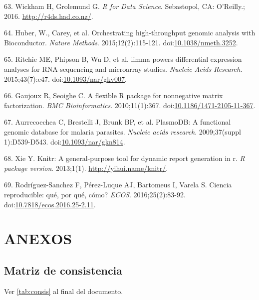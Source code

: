 \documentclass[a4paper]{article}
\begin{document}
\hypertarget{ref-wickham2016r4ds}{}
63. Wickham H, Grolemund G. \emph{R for Data Science}. Sebastopol, CA:
O'Reilly.; 2016. \url{http://r4ds.had.co.nz/}.

\hypertarget{ref-Biobase}{}
64. Huber, W., Carey, et al. Orchestrating high-throughput genomic
analysis with Bioconductor. \emph{Nature Methods}. 2015;12(2):115-121.
doi:\href{https://doi.org/10.1038/nmeth.3252}{10.1038/nmeth.3252}.

\hypertarget{ref-limma}{}
65. Ritchie ME, Phipson B, Wu D, et al. limma powers differential
expression analyses for RNA-sequencing and microarray studies.
\emph{Nucleic Acids Research}. 2015;43(7):e47.
doi:\href{https://doi.org/10.1093/nar/gkv007}{10.1093/nar/gkv007}.

\hypertarget{ref-Gaujoux2010NMF}{}
66. Gaujoux R, Seoighe C. A flexible R package for nonnegative matrix
factorization. \emph{BMC Bioinformatics}. 2010;11(1):367.
doi:\href{https://doi.org/10.1186/1471-2105-11-367}{10.1186/1471-2105-11-367}.

\hypertarget{ref-plasmodb}{}
67. Aurrecoechea C, Brestelli J, Brunk BP, et al. PlasmoDB: A functional
genomic database for malaria parasites. \emph{Nucleic acids research}.
2009;37(suppl 1):D539-D543.
doi:\href{https://doi.org/10.1093/nar/gkn814}{10.1093/nar/gkn814}.

\hypertarget{ref-knitr}{}
68. Xie Y. Knitr: A general-purpose tool for dynamic report generation
in r. \emph{R package version}. 2013;1(1).
\url{http://yihui.name/knitr/}.

\hypertarget{ref-CienciaReproducible2016}{}
69. Rodríguez-Sanchez F, Pérez-Luque AJ, Bartomeus I, Varela S. Ciencia
reproducible: qué, por qué, cómo? \emph{ECOS}. 2016;25(2):83-92.
doi:\href{https://doi.org/10.7818/ecos.2016.25-2.11}{10.7818/ecos.2016.25-2.11}.

\section{ANEXOS}\label{anexos}

\subsection{Matriz de consistencia}\label{matriz-de-consistencia}

Ver \autoref{tab:consis} al final del documento.
\end{document}
